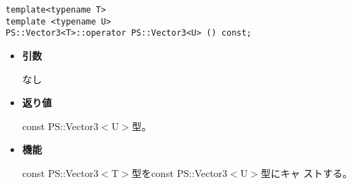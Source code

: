 \mbox{}

\begin{screen}
\begin{verbatim}
template<typename T>
template <typename U>
PS::Vector3<T>::operator PS::Vector3<U> () const;
\end{verbatim}
\end{screen}

\begin{itemize}

\item{{\bf 引数}}

  なし

\item{{\bf 返り値}}

  {const PS::Vector3$<$U$>$}型。

\item{{\bf 機能}}

  {const PS::Vector3$<$T$>$}型を{const PS::Vector3$<$U$>$}型にキャ
  ストする。

\end{itemize}
